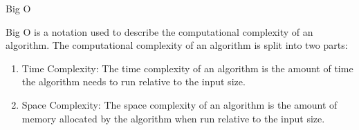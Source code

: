 {\large Big O}

Big O is a notation used to describe the computational complexity of an algorithm. The computational complexity of an algorithm is split into two parts:

\begin{enumerate}
	\item{} Time Complexity: The time complexity of an algorithm is the amount of time the algorithm needs to run relative to the input size.
	\item{} Space Complexity: The space complexity of an algorithm is the amount of memory allocated by the algorithm when run relative to the input size.
\end{enumerate}
